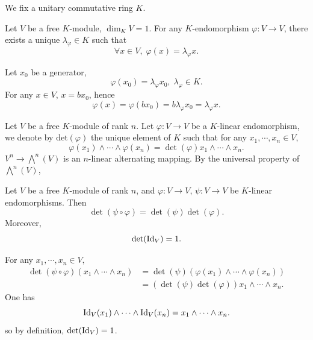 We fix a unitary commutative ring $K$.

\begin{propositionenv}
    Let $V$ be a free $K$-module, $\dim_{K} V = 1$.
    For any $K$-endomorphism $\varphi: V\rightarrow V$, there exists a unique $\lambda_{\varphi} \in K$ such that
    $$ \forall x\in V,\; \varphi(x) = \lambda_{\varphi} x.$$
\end{propositionenv}
\begin{proofenv}
    Let $x_0$ be a generator,
    $$ \varphi(x_0) = \lambda_{\varphi} x_0,\; \lambda_{\varphi} \in K.$$
    For any $x\in V$, $x = bx_0$, hence 
    $$ \varphi(x) = \varphi(b x_0) = b \lambda_{\varphi} x_0 = \lambda_{\varphi} x.$$
\end{proofenv}

\begin{definitionenv}
    Let $V$ be a free $K$-module of rank $n$.
    Let $\varphi : V \rightarrow V$ be a $K$-linear endomorphism, we denote by $\mathrm{det} (\varphi)$ the unique element of $K$ such that for any $x_1,\cdots,x_n \in V$,
    $$ \varphi(x_1) \wedge \cdots \wedge \varphi(x_n) = \det (\varphi) x_1 \wedge \cdots \wedge x_n.$$
    $V^n\rightarrow \bigwedge^n (V)$ is an $n$-linear alternating mapping.
    By the universal property of $\bigwedge^n (V)$,
    \begin{center}
    \end{center}
\end{definitionenv}

\begin{propositionenv}\label{thm:LinearMap.det_comp}
    Let $V$ be a free $K$-module of rank $n$, and $\varphi: V\rightarrow V$, $\psi: V\rightarrow V$ be $K$-linear endomorphisms.
    Then
    $$ \det (\psi \circ \varphi) = \det (\psi) \det (\varphi).$$
    Moreover,
    $$ \det (\operatorname{\mathrm{Id}}_V) =1.$$
\end{propositionenv}
\begin{proofenv}
    For any $x_1,\cdots,x_n \in V,$
    $$\begin{aligned}
        \det (\psi \circ \varphi) \left(x_1 \wedge \cdots \wedge x_n\right) &= \det (\psi) \left(\varphi(x_1) \wedge \cdots \wedge \varphi(x_n)\right)\\
        &= \left(\det (\psi) \det (\varphi)\right) x_1 \wedge \cdots \wedge x_n.
    \end{aligned}$$
    One has 
    $$ \operatorname{\mathrm{Id}}_V(x_1) \wedge \cdots \wedge \operatorname{\mathrm{Id}}_V(x_n) = x_1 \wedge \cdots \wedge x_n.$$
    so by definition, $\det (\operatorname{\mathrm{Id}}_V) = 1$.
\end{proofenv}


